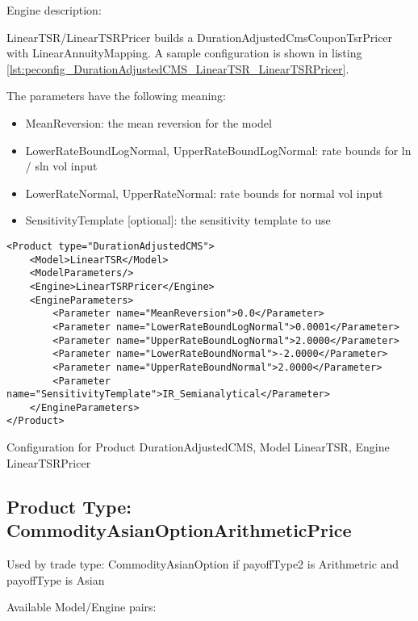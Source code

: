 Engine description:

LinearTSR/LinearTSRPricer builds a DurationAdjustedCmsCouponTsrPricer with LinearAnnuityMapping. A sample configuration
is shown in listing \ref{lst:peconfig_DurationAdjustedCMS_LinearTSR_LinearTSRPricer}.

The parameters have the following meaning:

\begin{itemize}
\item MeanReversion: the mean reversion for the model
\item LowerRateBoundLogNormal, UpperRateBoundLogNormal: rate bounds for ln / sln vol input
\item LowerRateNormal, UpperRateNormal: rate bounds for normal vol input
\item SensitivityTemplate [optional]: the sensitivity template to use 
\end{itemize}

\begin{longlisting}
\begin{verbatim}
<Product type="DurationAdjustedCMS">
    <Model>LinearTSR</Model>
    <ModelParameters/>
    <Engine>LinearTSRPricer</Engine>
    <EngineParameters>
        <Parameter name="MeanReversion">0.0</Parameter>
        <Parameter name="LowerRateBoundLogNormal">0.0001</Parameter>
        <Parameter name="UpperRateBoundLogNormal">2.0000</Parameter>
        <Parameter name="LowerRateBoundNormal">-2.0000</Parameter>
        <Parameter name="UpperRateBoundNormal">2.0000</Parameter>
        <Parameter name="SensitivityTemplate">IR_Semianalytical</Parameter>
    </EngineParameters>
</Product>
\end{verbatim}
\caption{Configuration for Product DurationAdjustedCMS, Model LinearTSR, Engine LinearTSRPricer}
\label{lst:peconfig_DurationAdjustedCMS_LinearTSR_LinearTSRPricer}
\end{longlisting}

\subsection{Product Type: CommodityAsianOptionArithmeticPrice}

Used by trade type: CommodityAsianOption if payoffType2 is Arithmetric and payoffType is Asian

Available Model/Engine pairs:

